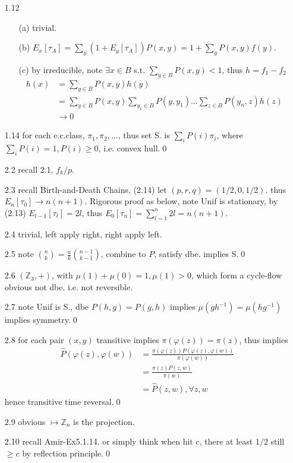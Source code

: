 \documentclass[paper=a4, fontsize=11pt]{scrartcl} %
\numberwithin{equation}{section} %
\numberwithin{figure}{section} %
\numberwithin{table}{section} %
\begin{document}
\begin{itemize}
	\item[1.12]
	\begin{itemize}
		\item[(a)] trivial.
		\item[(b)] $E_x[\tau_A] = \sum_y (1+E_y[\tau_A])P(x,y)= 1 + \sum_y P(x,y)f(y)$.
		\item[(c)] by irreducible, note $\exists x\in B$ s.t. $\sum_{y\in B}P(x,y)<1$, thus $h=f_1-f_2$
		\begin{align}
			h(x) &= \sum_{y\in B}P(x,y)h(y)\\
				&= \sum_{y\in B}P(x,y)\sum_{y_1\in B}P(y,y_1)\dots\sum_{z\in B}P(y_n,z)h(z)\\
				&\rightarrow 0
		\end{align}
	\end{itemize}
	\item[1.14] for each e.c.class, $\pi_1,\pi_2,...$, thus set S. is $\sum_i P(i)\pi_i$, where $\sum_i P(i)=1, P(i)\geq 0$, i.e. convex hull.\qed
	\item[2.2] recall 2.1, $f_k/p$.
	\item[2.3] recall Birth-and-Death Chains, (2.14) let $(p,r,q)=(1/2,0,1/2)$. thus $E_n[\tau_0] \rightarrow n(n+1)$. Rigorous proof as below, note Unif is stationary, by (2.13) $E_{l-1}[\tau_l]=2l$, thus $E_0[\tau_n]=\sum_{l=1}^n 2l=n(n+1)$.
	\item[2.4] trivial, left apply right, right apply left.
	\item[2.5] note ${n \choose k} = \frac{n}{k} {n-1 \choose k-1}$, combine to $P$, satisfy dbe. implies S.\qed
	\item[2.6] $(\mathbb{Z}_3,+)$, with $\mu(1)+\mu(0)=1,\mu(1)>0$, which form a cycle-flow obvious not dbe. i.e. not reversible.
	\item[2.7] note Unif is S., dbe $P(h,g)=P(g,h)$ implies $\mu(gh^{-1})=\mu(hg^{-1})$ implies symmetry.\qed
	\item[2.8] for each pair $(x,y)$ transitive implies $\pi(\varphi(z))=\pi(z)$, thus implies 
	\begin{align}
		\widehat{P}(\varphi(z),\varphi(w)) &= \frac{\pi(\varphi(z))P(\varphi(z),\varphi(w))}{\pi(\varphi(w))}\\
			&= \frac{\pi(z)P(z,w)}{\pi(w)}\\
			&= \widehat{P}(z,w), \forall z,w
	\end{align}
	hence transitive time reversal.\qed
	\item[2.9] obvious $\mapsto \mathbb{Z}_n$ is the projection.
	\item[2.10] recall Amir-Ex5.1.14. or simply think when hit c, there at least $1/2$ still $\geq c$ by reflection principle.\qed

\end{itemize}
\end{document}
